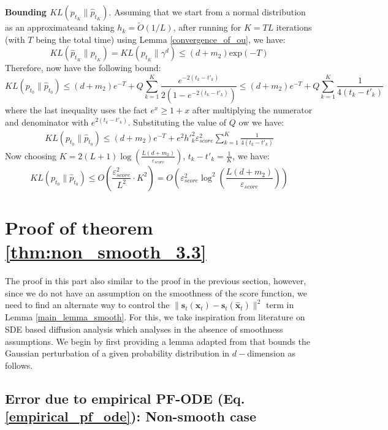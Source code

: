 \documentclass[11pt]{article}
\def\rvx{{\mathbf{x}}}
\def\vs{{\bm{s}}}
\begin{document}
\noindent
\textbf{Bounding $KL({p}_{t_K}\|\hat{p}_{t_K})$}. Assuming that we start from a normal distribution as an approximateand taking $h_k=\tilde{O}(1/L)$, after running for $K=TL$ iterations (with $T$ being the total time) using {Lemma \ref{convergence_of_ou}}, we have:
\[
KL(\hat{p}_{t_K}\|p_{t_K}) = KL(p_{t_K}\|\gamma^d) \leq ({d}+m_2) \text{exp}(-T)
\]
Therefore, now have the following bound:
\[
KL(p_{t_0}\|\hat{p}_{t_0}) \leq (d+m_2) e^{-T} +  Q \sum_{k=1}^K\frac{e^{-2(t_k-t'_k)}}{2(1-e^{-2(t_k-t'_k)})} \leq (d+m_2) e^{-T} +  Q \sum_{k=1}^K\frac{1}{4(t_k-t'_k)}
\]
where the last inequality uses the fact $e^x\geq 1+x$ after multiplying the numerator and denominator with $e^{2(t_k-t'_k)}$. Substituting the value of $Q$ ow we have:
\begin{align*}
    KL(p_{t_0}\|\hat{p}_{t_0}) \leq (d+m_2) e^{-T} +  e^2{h'}_k^2\varepsilon^2_{score} \sum_{k=1}^K\frac{1}{4(t_k-t'_k)}
\end{align*}
Now choosing $K=2(L+1)\log\left(\frac{L(d+m_2)}{\varepsilon_{score}}\right)$, $t_k-t'_k = \frac{1}{K}$, we have: 
\[
KL(p_{t_0}\|\hat{p}_{t_0}) \leq {O}\left(\frac{\varepsilon^2_{score}}{L^2}\cdot K^2\right) = {O}\left({\varepsilon^2_{score}}\log^2\left(\frac{L(d+m_2)}{\varepsilon_{score}}\right)\right)
\]

\vspace{0.2in}
\section{ Proof of theorem \ref{thm:non_smooth_3.3}}
\label{appendix_non_smooth}
\noindent
The proof in this part also similar to the proof in the previous section, however, since we do not have an assumption on the smoothness of the score function, we need to find an alternate way to control the $\|\vs_t(\rvx_t)-{\vs}_t(\hat{\rvx}_t)\|^2$ term in Lemma \ref{main_lemma_smooth}. For this, we take inspiration from literature \cite{chen2023improved,benton2024nearly} on SDE based diffusion analysis which analyses in the absence of smoothness assumptions. We begin by first providing a lemma adapted from \cite{chen2023improved} that bounds the Gaussian perturbation of a given probability distribution in $d-$dimension as follows. 

\subsection{Error due to empirical PF-ODE (Eq. \ref{empirical_pf_ode}): Non-smooth case}
\label{error_due_to_empirical_non_smooth}
\end{document}
